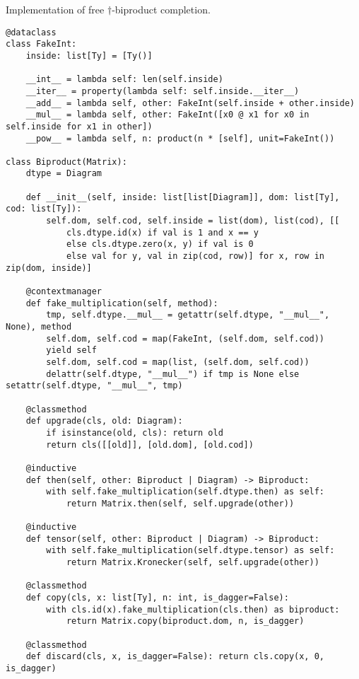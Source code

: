 \begin{python}
{\normalfont Implementation of free $\dagger$-biproduct completion.}

\begin{verbatim}
@dataclass
class FakeInt:
    inside: list[Ty] = [Ty()]

    __int__ = lambda self: len(self.inside)
    __iter__ = property(lambda self: self.inside.__iter__)
    __add__ = lambda self, other: FakeInt(self.inside + other.inside)
    __mul__ = lambda self, other: FakeInt([x0 @ x1 for x0 in self.inside for x1 in other])
    __pow__ = lambda self, n: product(n * [self], unit=FakeInt())

class Biproduct(Matrix):
    dtype = Diagram

    def __init__(self, inside: list[list[Diagram]], dom: list[Ty], cod: list[Ty]):
        self.dom, self.cod, self.inside = list(dom), list(cod), [[
            cls.dtype.id(x) if val is 1 and x == y
            else cls.dtype.zero(x, y) if val is 0
            else val for y, val in zip(cod, row)] for x, row in zip(dom, inside)]

    @contextmanager
    def fake_multiplication(self, method):
        tmp, self.dtype.__mul__ = getattr(self.dtype, "__mul__", None), method
        self.dom, self.cod = map(FakeInt, (self.dom, self.cod))
        yield self
        self.dom, self.cod = map(list, (self.dom, self.cod))
        delattr(self.dtype, "__mul__") if tmp is None else setattr(self.dtype, "__mul__", tmp)

    @classmethod
    def upgrade(cls, old: Diagram):
        if isinstance(old, cls): return old
        return cls([[old]], [old.dom], [old.cod])

    @inductive
    def then(self, other: Biproduct | Diagram) -> Biproduct:
        with self.fake_multiplication(self.dtype.then) as self:
            return Matrix.then(self, self.upgrade(other))

    @inductive
    def tensor(self, other: Biproduct | Diagram) -> Biproduct:
        with self.fake_multiplication(self.dtype.tensor) as self:
            return Matrix.Kronecker(self, self.upgrade(other))

    @classmethod
    def copy(cls, x: list[Ty], n: int, is_dagger=False):
        with cls.id(x).fake_multiplication(cls.then) as biproduct:
            return Matrix.copy(biproduct.dom, n, is_dagger)

    @classmethod
    def discard(cls, x, is_dagger=False): return cls.copy(x, 0, is_dagger)


\end{verbatim}
\end{python}
